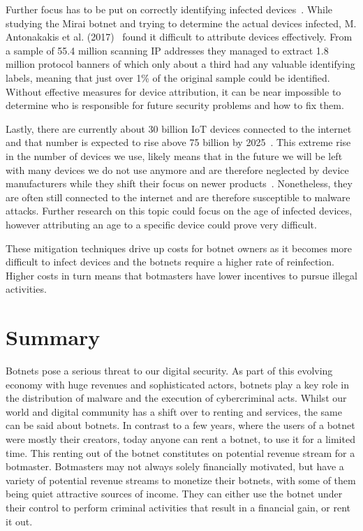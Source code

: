 Further focus has to be put on correctly identifying infected devices~\cite{Antonakakis17}.
While studying the Mirai botnet and trying to determine the actual devices infected, M. Antonakakis et al. (2017)~\cite{Antonakakis17} found it difficult to attribute devices effectively.
From a sample of 55.4 million scanning IP addresses they managed to extract 1.8 million protocol banners of which only about a third had any valuable identifying labels, meaning that just over 1\% of the original sample could be identified.
Without effective measures for device attribution, it can be near impossible to determine who is responsible for future security problems and how to fix them.

Lastly, there are currently about 30 billion IoT devices connected to the internet and that number is expected to rise above 75 billion by 2025~\cite{Statista}.
This extreme rise in the number of devices we use, likely means that in the future we will be left with many devices we do not use anymore and are therefore neglected by device manufacturers while they shift their focus on newer products~\cite{Antonakakis17}.
Nonetheless, they are often still connected to the internet and are therefore susceptible to malware attacks.
Further research on this topic could focus on the age of infected devices, however attributing an age to a specific device could prove very difficult.

These mitigation techniques drive up costs for botnet owners as it becomes more difficult to infect devices and the botnets require a higher rate of reinfection.
Higher costs in turn means that botmasters have lower incentives to pursue illegal activities.


\section{Summary}
Botnets pose a serious threat to our digital security.
As part of this evolving economy with huge revenues and sophisticated actors, botnets play a key role in the distribution of malware and the execution of cybercriminal acts. 
Whilst our world and digital community has a shift over to renting and services, the same can be said about botnets. In contrast to a few years, where the users of a botnet were mostly their creators, today anyone can rent a botnet, to use it for a limited time.
This renting out of the botnet constitutes on potential revenue stream for a botmaster. 
Botmasters may not always solely financially motivated, but have a variety of potential revenue streams to monetize their botnets, with some of them being quiet attractive sources of income. 
They can either use the botnet under their control to perform criminal activities that result in a financial gain, or rent it out. 

